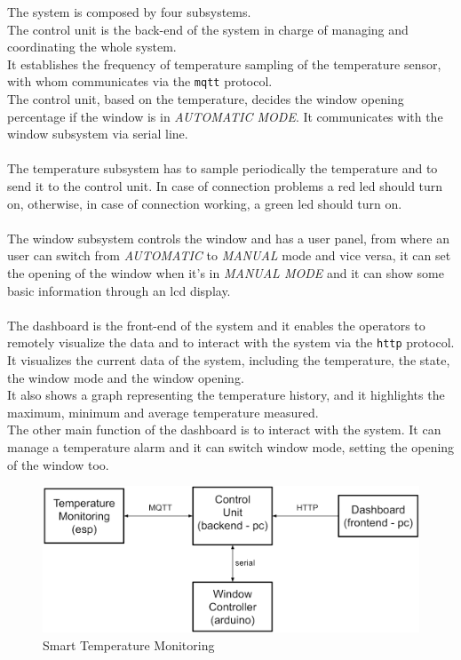 \documentclass[a4paper,12pt]{report}
\begin{document}
        The system is composed by four subsystems.\\
        The control unit is the back-end of the system in charge of managing and coordinating the whole system.\\
        It establishes the frequency of temperature sampling of the temperature sensor, with whom communicates via
        the \texttt{mqtt} protocol.\\        
        The control unit, based on the temperature, decides the window opening percentage
        if the window is in \textit{AUTOMATIC MODE}.
        It communicates with the window subsystem via serial line. \\\\
        The temperature subsystem has to sample periodically the temperature and to send it to the control unit.
        In case of connection problems a red led should turn on, otherwise, in case of connection working, a green led
        should turn on.\\\\
        The window subsystem controls the window and has a user panel, from where an user can switch from \textit{AUTOMATIC} to
        \textit{MANUAL} mode and vice versa, it can set the opening of the window when it's in \textit{MANUAL MODE} and it can show some
        basic information through an lcd display.\\\\
        The dashboard is the front-end of the system and it enables the operators to remotely visualize the data and to interact
        with the system via the \texttt{http} protocol. \\
        It visualizes the current data of the system, including the temperature, the state, the window mode and the window opening.\\
        It also shows a graph representing the temperature history, and it highlights the maximum, minimum and average
        temperature measured.\\
        The other main function of the dashboard is to interact with the system.
        It can manage a temperature alarm and it can switch window mode, setting the opening of the window too.

        \begin{figure}[H]
            \centering{}
            \includegraphics[width=350pt]{report/img/Assignment-03_SMT-Domain.png}
            \caption{Smart Temperature Monitoring}
            \label{img:system}
        \end{figure}
\end{document}
